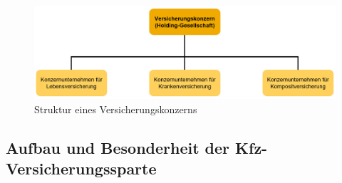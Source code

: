 \begin{figure}[h]
    \centering
    \includegraphics[width=1\textwidth]{img/Struktur_VKonzern2.jpg}
    \caption[Struktur eines Versicherungskonzerns]{Struktur eines Versicherungskonzerns\autocite{StVKonzern}}
    \label{fig:StVKonzern}
\end{figure}

\newpage

\subsection{Aufbau und Besonderheit der Kfz-Versicherungssparte}

\newpage
